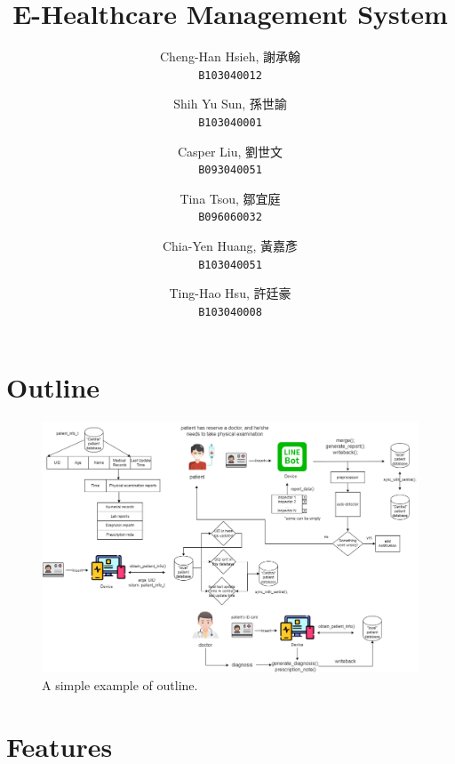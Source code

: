 \documentclass{article}
\begin{document}
\title{E-Healthcare Management System}
\author{
  Cheng-Han Hsieh, 謝承翰\\
  \texttt{B103040012}
  \and
  Shih Yu Sun, 孫世諭\\
  \texttt{B103040001}
  \and
  Casper Liu, 劉世文\\
  \texttt{B093040051}
  \and
  Tina Tsou, 鄒宜庭\\
  \texttt{B096060032}
  \and
  Chia-Yen Huang, 黃嘉彥\\
  \texttt{B103040051}
  \and
  Ting-Hao Hsu, 許廷豪\\
  \texttt{B103040008}
}

\maketitle

\section{Outline}
\label{sec:outline}

\begin{figure}[h]
  \centering
  \includegraphics[scale = 0.3]{asset/flowchart.png}
  \caption{A simple example of outline.}
  \label{fig:flowchart}
\end{figure}


\section{Features}
\label{sec:features}
\end{document}
